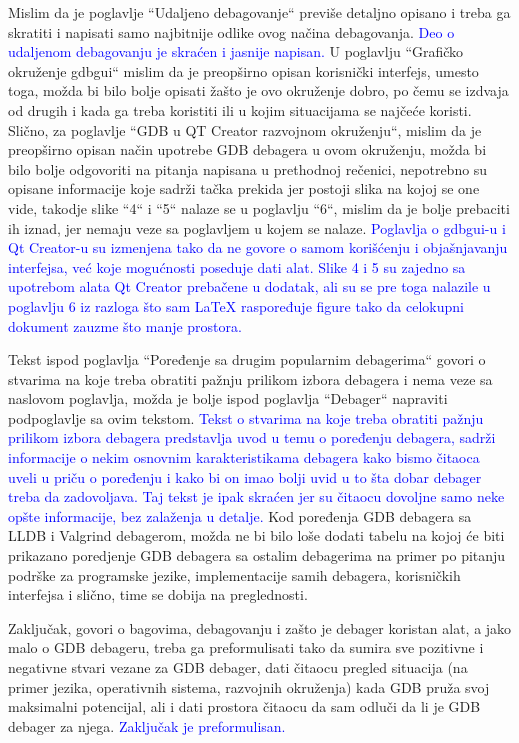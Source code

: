 \documentclass[a4paper]{report}
\newcommand{\odgovor}[1]{\textcolor{blue}{#1}}
\begin{document}
Mislim da je poglavlje ``Udaljeno debagovanje`` previše detaljno opisano i treba ga skratiti i napisati samo najbitnije odlike ovog načina debagovanja. \odgovor{Deo o udaljenom debagovanju je skraćen i jasnije napisan.} U poglavlju ``Grafičko okruženje gdbgui`` mislim da je preopširno opisan korisnički interfejs, umesto toga, možda bi bilo bolje opisati žašto je ovo okruženje dobro, po čemu se izdvaja od drugih i kada ga treba koristiti ili u kojim situacijama se najčeće koristi. Slično, za poglavlje ``GDB u QT Creator razvojnom okruženju``, mislim da je preopširno opisan način upotrebe GDB debagera u ovom okruženju, možda bi bilo bolje odgovoriti na pitanja napisana u prethodnoj rečenici, nepotrebno su opisane informacije koje sadrži tačka prekida jer postoji slika na kojoj se one vide, takodje slike ``4`` i ``5`` nalaze se u poglavlju ``6``, mislim da je bolje prebaciti ih iznad, jer nemaju veze sa poglavljem u kojem se nalaze.
\odgovor{Poglavlja o gdbgui-u i Qt Creator-u su izmenjena tako da ne govore o samom korišćenju i objašnjavanju interfejsa, već koje mogućnosti poseduje dati alat. Slike 4 i 5 su zajedno
sa upotrebom alata Qt Creator prebačene u dodatak, ali su se pre toga nalazile u poglavlju 6 iz razloga što sam \LaTeX {} raspoređuje figure tako da celokupni dokument zauzme što manje 
prostora.}

Tekst ispod poglavlja ``Poređenje sa drugim popularnim debagerima`` govori o stvarima na koje treba obratiti pažnju prilikom izbora debagera i nema veze sa naslovom poglavlja, možda je bolje ispod poglavlja ``Debager`` napraviti podpoglavlje sa ovim tekstom. \odgovor{Tekst o stvarima na koje treba obratiti pažnju prilikom izbora debagera predstavlja uvod u temu o poređenju debagera, sadrži informacije o nekim osnovnim karakteristikama debagera kako bismo čitaoca uveli u priču o poređenju i kako bi on imao bolji uvid u to šta dobar debager treba da zadovoljava. Taj tekst je ipak skraćen jer su čitaocu dovoljne samo neke opšte informacije, bez zalaženja u detalje.} Kod poređenja GDB debagera sa LLDB i Valgrind debagerom, možda ne bi bilo loše dodati tabelu na kojoj će biti prikazano poredjenje GDB debagera sa ostalim debagerima na primer po pitanju podrške za programske jezike, implementacije samih debagera, korisničkih interfejsa i slično, time se dobija na preglednosti. 

Zaključak, govori o bagovima, debagovanju i zašto je debager koristan alat, a jako malo o GDB debageru, treba ga preformulisati tako da sumira sve pozitivne i negativne stvari vezane za GDB debager, dati čitaocu pregled situacija (na primer jezika, operativnih sistema, razvojnih okruženja) kada GDB pruža svoj maksimalni potencijal, ali i dati prostora čitaocu da sam odluči da li je GDB debager za njega.
\odgovor{Zaključak je preformulisan.} 
\end{document}
